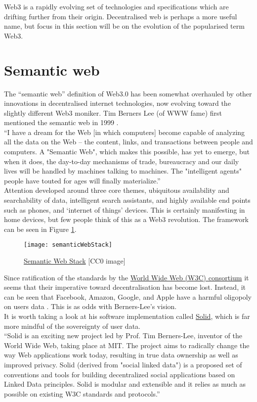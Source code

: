 Web3 is a rapidly evolving set of technologies and specifications which are drifting further from their origin. Decentralised web is perhaps a more useful name, but focus in this section will be on the evolution of the popularised term Web3. 
\section{Semantic web}
The ``semantic web'' definition of Web3.0 has been somewhat overhauled by other innovations in decentralised internet technologies, now evolving toward the slightly different Web3 moniker. Tim Berners Lee (of WWW fame) first mentioned the semantic web in 1999 \cite{semanticWeb}.\\
``I have a dream for the Web [in which computers] become capable of analyzing all the data on the Web – the content, links, and transactions between people and computers. A "Semantic Web", which makes this possible, has yet to emerge, but when it does, the day-to-day mechanisms of trade, bureaucracy and our daily lives will be handled by machines talking to machines. The "intelligent agents" people have touted for ages will finally materialize.''\\
Attention developed around three core themes, ubiquitous availability and searchability of data, intelligent search assistants, and highly available end points such as phones, and `internet of things' devices. This is certainly manifesting in home devices, but few people think of this as a Web3 revolution. The framework can be seen in Figure \ref{fig:semanticWebStack}.\\
\begin{figure}
  \centering
    \texttt{[image: semanticWebStack]}
  \caption{\href{https://en.wikipedia.org/wiki/Semantic_Web_Stack}{Semantic Web Stack} [CC0 image]}
  \label{fig:semanticWebStack}
\end{figure}
Since ratification of the standards by the \href{https://www.w3.org/standards/semanticweb/}{World Wide Web (W3C) consortium} it seems that their imperative toward decentralisation has become lost. Instead, it can be seen that Facebook, Amazon, Google, and Apple have a harmful oligopoly on users data \cite{costigan2018world}. This is as odds with Berners-Lee's vision. \\
It is worth taking a look at his software implementation called \href{https://solidproject.org}{Solid}, which is far more mindful of the sovereignty of user data.\\
``Solid is an exciting new project led by Prof. Tim Berners-Lee, inventor of the World Wide Web, taking place at MIT. The project aims to radically change the way Web applications work today, resulting in true data ownership as well as improved privacy. Solid (derived from "social linked data") is a proposed set of conventions and tools for building decentralized social applications based on Linked Data principles. Solid is modular and extensible and it relies as much as possible on existing W3C standards and protocols.'' \\
